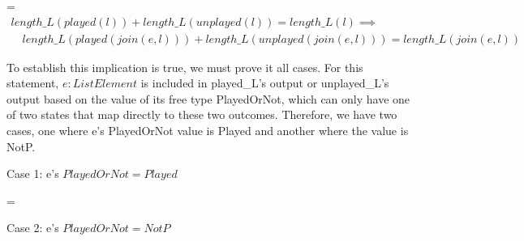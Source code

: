 \documentclass[a4paper,10pt,fleqn]{article}
\begin{document}
\bigskip

\savedleftskip=\leftskip
\noindent
$\displaystyle
\begin{array}{l}
length\_L(played(l)) + length\_L(unplayed(l)) = length\_L(l) \implies \\
\quad length\_L(played(join(e, l))) + length\_L(unplayed(join(e, l))) = length\_L(join(e, l))
\end{array}$

\bigskip

\noindent To establish this implication is true, we must prove it all cases. For this statement, $e : ListElement$ is included in played\_L's output or unplayed\_L's output based on the value of its free type PlayedOrNot, which can only have one of two states that map directly to these two outcomes.  Therefore, we have two cases, one where e's PlayedOrNot value is Played and another where the value is NotP.

\bigskip

\newpage

\noindent Case 1: e's $PlayedOrNot = Played$

\bigskip

\savedleftskip=\leftskip
\noindent
{}
\bigskip

\noindent Case 2: e's $PlayedOrNot = NotP$

\bigskip
\end{document}
